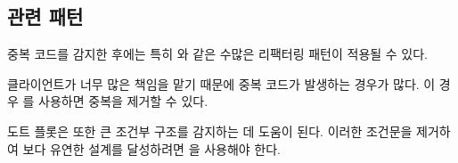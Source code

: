 \documentclass[a4paper,10pt,twoside]{book}
\begin{document}
\subsection*{관련 패턴}

중복 코드를 감지한 후에는 특히 와 같은 수많은 리팩터링 패턴이 적용될 수 있다.

클라이언트가 너무 많은 책임을 맡기 때문에 중복 코드가 발생하는 경우가 많다. 이 경우 를 사용하면 중복을 제거할 수 있다.

도트 플롯은 또한 큰 조건부 구조를 감지하는 데 도움이 된다. 이러한 조건문을 제거하여 보다 유연한 설계를 달성하려면 을 사용해야 한다. 

\ifx\wholebook\relax\else
   
   
   
\end{document}
